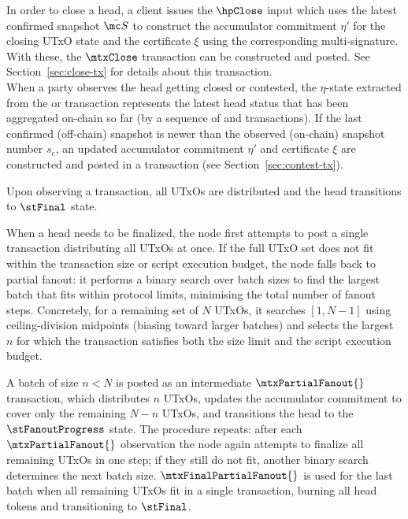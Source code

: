 \quad In order to close a head, a client issues the
$\hpClose$ input which uses the latest confirmed snapshot $\bar{\mc S}$ to
construct the accumulator commitment $\eta'$ for the closing UTxO state
and the certificate $\xi$ using the corresponding multi-signature. With these, the $\mtxClose$ transaction
can be constructed and posted. See Section~\ref{sec:close-tx} for details about this
transaction. \\

\quad When a party observes
the head getting closed or contested, the $\eta$-state extracted from the
\mtxClose{} or \mtxContest{} transaction represents the latest head status that
has been aggregated on-chain so far (by a sequence of \mtxClose{} and
\mtxContest{} transactions). If the last confirmed (off-chain) snapshot is newer
than the observed (on-chain) snapshot number $s_{c}$, an updated accumulator
commitment $\eta'$ and certificate $\xi$ are constructed and posted in a \mtxContest{} transaction (see
Section~\ref{sec:contest-tx}).

\quad Upon observing a \mtxFanout{}
transaction, all UTxOs are distributed and the head transitions to $\stFinal$ state.

\quad When a head needs to be finalized,
the node first attempts to post a single \mtxFanout{} transaction distributing all UTxOs at once.
If the full UTxO set does not fit within the transaction size or script execution budget, the node
falls back to partial fanout: it performs a binary search over batch sizes to find the largest
batch that fits within protocol limits, minimising the total number of fanout steps. Concretely, for
a remaining set of $N$ UTxOs, it searches $[1, N-1]$ using ceiling-division midpoints (biasing
toward larger batches) and selects the largest $n$ for which the transaction satisfies both the size
limit and the script execution budget.

A batch of size $n < N$ is posted as an intermediate $\mtxPartialFanout{}$ transaction, which
distributes $n$ UTxOs, updates the accumulator commitment to cover only the remaining $N - n$
UTxOs, and transitions the head to the $\stFanoutProgress$ state. The procedure repeats: after
each $\mtxPartialFanout{}$ observation the node again attempts to finalize all remaining UTxOs in
one step; if they still do not fit, another binary search determines the next batch size.
$\mtxFinalPartialFanout{}$ is used for the last batch when all remaining UTxOs fit in a single
transaction, burning all head tokens and transitioning to $\stFinal$.

